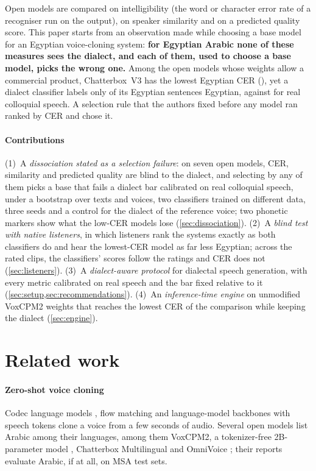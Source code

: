 \documentclass[11pt]{article}
\newcommand{\vox}{VoxCPM2\xspace}
\newcommand{\cbthree}{Chatterbox~V3\xspace}
\begin{document}
Open models are compared on intelligibility (the word or character error rate of a recogniser run on the output), on
speaker similarity and on a predicted quality score. This paper starts from an observation made while choosing a base
model for an Egyptian voice-cloning system: \textbf{for Egyptian Arabic none of these measures sees the dialect, and each
of them, used to choose a base model, picks the wrong one.} Among the open models whose weights allow a commercial
product, \cbthree has the lowest Egyptian CER (), yet a dialect classifier labels only
 of its Egyptian sentences Egyptian, against  for real colloquial speech. A
selection rule that the authors fixed before any model ran ranked by CER and chose it.

\paragraph{Contributions}
(1)~A \emph{dissociation stated as a selection failure}: on seven open models, CER, similarity and predicted quality are
blind to the dialect, and selecting by any of them picks a base that fails a dialect bar calibrated on real colloquial
speech, under a bootstrap over texts and voices, two classifiers trained on different data, three seeds and a control
for the dialect of the reference voice; two phonetic markers show what the low-CER models lose (\cref{sec:dissociation}). (2)~A \emph{blind test with native listeners}, in
which listeners rank the systems exactly as both classifiers do and hear the lowest-CER model as far less Egyptian; across
the rated clips, the classifiers' scores follow the ratings and CER does not (\cref{sec:listeners}). (3)~A \emph{dialect-aware protocol} for dialectal speech generation, with every metric
calibrated on real speech and the bar fixed relative to it (\cref{sec:setup,sec:recommendations}). (4)~An \emph{inference-time engine} on
unmodified \vox weights that reaches the lowest CER of the comparison while keeping the dialect (\cref{sec:engine}).

\section{Related work}
\paragraph{Zero-shot voice cloning}
Codec language models \citep{chen2025valle}, flow matching \citep{chen2025f5tts} and language-model backbones with speech
tokens \citep{du2024cosyvoice2,casanova2024xtts} clone a voice from a few seconds of audio. Several open models list
Arabic among their languages, among them \vox, a tokenizer-free 2B-parameter model \citep{zhou2026voxcpm2}, Chatterbox
Multilingual \citep{resemble2025chatterbox} and OmniVoice \citep{zhu2026omnivoice}; their reports evaluate Arabic, if at
all, on MSA test sets.
\end{document}
